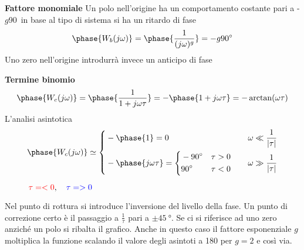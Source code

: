 \newpage
\textbf{Fattore monomiale} Un polo nell'origine ha un comportamento costante
pari a -$g$90\textdegree\ in base al tipo di sistema si ha un ritardo di fase
$$
\phase{W_b(j\omega)} = \phase{\frac{1}{(j\omega)^g}} = -g\SI{90}{\degree}
$$
Uno zero nell'origine introdurrà invece un anticipo di fase

\textbf{Termine binomio}
$$
\phase{W_c(j\omega)} = \phase{\frac{1}{1+j\omega \tau}} =
-\phase{1+j\omega\tau} = -\arctan(\omega\tau)
$$
L'analisi asintotica
$$
\phase{W_c(j\omega)} \simeq \left\{
\begin{aligned}
&-\phase{1}= 0 & & & \omega \ll \frac{1}{|\tau|} \\
&-\phase{j\omega\tau} = \left\{
\begin{aligned}
&\SI{-90}{\degree} & &\tau> 0 \\
&\SI{90}{\degree} & & \tau<0
\end{aligned}\right. & & & \omega \gg \frac{1}{|\tau|}
\end{aligned}\right.
$$

\begin{figure}[h]
\centering
{}
\caption{$\textcolor{red}{\tau=<0},\quad
\textcolor{blue}{\tau=>0} $}
\label{fig.phase_monomio}
\end{figure}
Nel punto di rottura si introduce l'inversione del livello della fase.
Un punto di correzione certo è il passaggio a $\frac{1}{\tau}$ pari a $\pm
\SI{45}{\degree}$. Se ci si riferisce ad uno zero anziché un polo si ribalta il
grafico.
Anche in questo caso il fattore esponenziale $g$ moltiplica la funzione
scalando il valore degli asintoti a 180 per $g=2$ e così via.

